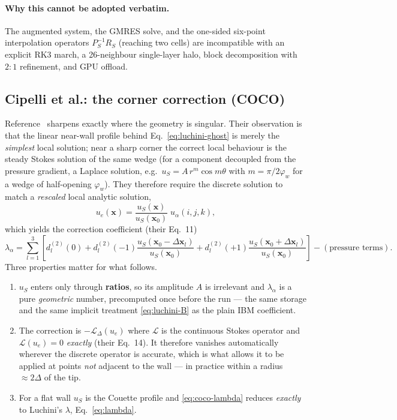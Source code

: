 \documentclass[11pt,a4paper]{article}
\begin{document}
\paragraph{Why this cannot be adopted verbatim.}
The augmented system, the GMRES solve, and the one-sided six-point
interpolation operators $P_S^{-1}R_S$ (reaching two cells) are incompatible with
an explicit RK3 march, a 26-neighbour single-layer halo, block decomposition
with $2\!:\!1$ refinement, and GPU offload.

\subsection{Cipelli et al.: the corner correction (COCO)}
\label{sec:coco-intro}

Reference~\cite{cipelli2025} sharpens \cite{luchini2025} exactly where the
geometry is singular. Their observation is that the linear near-wall profile
behind Eq.~\eqref{eq:luchini-ghost} is merely the \emph{simplest} local
solution; near a sharp corner the correct local behaviour is the steady Stokes
solution of the same wedge (for a component decoupled from the pressure
gradient, a Laplace solution, e.g.\ $u_S=A\,r^{m}\cos m\theta$ with
$m=\pi/2\varphi_w$ for a wedge of half-opening $\varphi_w$). They therefore
require the discrete solution to match a \emph{rescaled} local analytic
solution,
\begin{equation}
  u_e(\boldsymbol{x}) = \frac{u_S(\boldsymbol{x})}{u_S(\boldsymbol{x}_0)}\;
                        u_\alpha(i,j,k),
  \label{eq:coco-rescale}
\end{equation}
which yields the correction coefficient (their Eq.~11)
\begin{equation}
  \lambda_\alpha=\sum_{l=1}^{3}\left[
     d^{(2)}_l(0)
   + d^{(2)}_l(-1)\frac{u_S(\boldsymbol{x}_0-\Delta\boldsymbol{x}_l)}{u_S(\boldsymbol{x}_0)}
   + d^{(2)}_l(+1)\frac{u_S(\boldsymbol{x}_0+\Delta\boldsymbol{x}_l)}{u_S(\boldsymbol{x}_0)}
     \right] - (\text{pressure terms}).
  \label{eq:coco-lambda}
\end{equation}
Three properties matter for what follows.
\begin{enumerate}
\item[(i)] $u_S$ enters only through \textbf{ratios}, so its amplitude $A$ is
      irrelevant and $\lambda_\alpha$ is a pure \emph{geometric} number,
      precomputed once before the run --- the same storage and the same
      implicit treatment \eqref{eq:luchini-B} as the plain IBM coefficient.
\item[(ii)] The correction is $-\mathcal{L}_\Delta(u_e)$ where $\mathcal{L}$ is
      the continuous Stokes operator and $\mathcal{L}(u_e)=0$ \emph{exactly}
      (their Eq.~14). It therefore vanishes automatically wherever the discrete
      operator is accurate, which is what allows it to be applied at points
      \emph{not} adjacent to the wall --- in practice within a radius
      $\approx2\Delta$ of the tip.
\item[(iii)] For a flat wall $u_S$ is the Couette profile and
      \eqref{eq:coco-lambda} reduces \emph{exactly} to Luchini's $\lambda$,
      Eq.~\eqref{eq:lambda}.
\end{enumerate}
\end{document}
